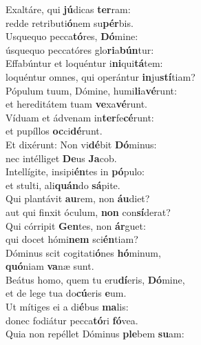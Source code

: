 \evenverse Exaltáre, qui \textbf{jú}dicas \textbf{ter}ram:~\*\\
\evenverse redde retributi\textbf{ó}nem su\textbf{pér}bis.\\
\oddverse Usquequo pecca\textbf{tó}res, \textbf{Dó}mine:~\*\\
\oddverse úsquequo peccatóres glo\textbf{ri}a\textbf{bún}tur:\\
\evenverse Effabúntur et loquéntur i\textbf{ni}qui\textbf{tá}tem:~\*\\
\evenverse loquéntur omnes, qui operántur \textbf{in}ju\textbf{stí}tiam?\\
\oddverse Pópulum tuum, Dómine, humi\textbf{li}a\textbf{vé}runt:~\*\\
\oddverse et hereditátem tuam \textbf{ve}xa\textbf{vé}runt.\\
\evenverse Víduam et ádvenam in\textbf{ter}fe\textbf{cé}runt:~\*\\
\evenverse et pupíllos \textbf{oc}ci\textbf{dé}runt.\\
\oddverse Et dixérunt: Non vi\textbf{dé}bit \textbf{Dó}minus:~\*\\
\oddverse nec intélliget \textbf{De}us \textbf{Ja}cob.\\
\evenverse Intellígite, insipi\textbf{én}tes in \textbf{pó}pulo:~\*\\
\evenverse et stulti, ali\textbf{quán}do \textbf{sá}pite.\\
\oddverse Qui plantávit \textbf{au}rem, non \textbf{áu}diet?~\*\\
\oddverse aut qui finxit óculum, \textbf{non} con\textbf{sí}derat?\\
\evenverse Qui córripit \textbf{Gen}tes, non \textbf{ár}guet:~\*\\
\evenverse qui docet hómi\textbf{nem} sci\textbf{én}tiam?\\
\oddverse Dóminus scit cogitati\textbf{ó}nes \textbf{hó}minum,~\*\\
\oddverse \textbf{quó}niam \textbf{va}næ sunt.\\
\evenverse Beátus homo, quem tu eru\textbf{dí}eris, \textbf{Dó}mine,~\*\\
\evenverse et de lege tua do\textbf{cú}eris \textbf{e}um.\\
\oddverse Ut mítiges ei a di\textbf{é}bus \textbf{ma}lis:~\*\\
\oddverse donec fodiátur pecca\textbf{tó}ri \textbf{fó}vea.\\
\evenverse Quia non repéllet Dóminus \textbf{ple}bem \textbf{su}am:~\*\\
